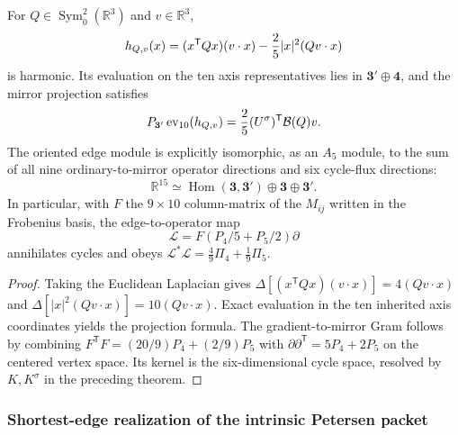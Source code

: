 \documentclass[11pt]{article}
\begin{document}
\begin{proposition}
\label{p1:prop:petersen-cubic-gradient-interface}
\leavevmode\par
For $Q\in\operatorname{Sym}^2_0(\mathbb R^3)$ and $v\in\mathbb R^3$,
\[
 h_{Q,v}(x)=(x^{\mathsf T}Qx)(v\cdot x)
 -{2\over5}|x|^2(Qv\cdot x)
\]
is harmonic. Its evaluation on the ten axis representatives lies in
$\mathbf3'\oplus\mathbf4$, and the mirror projection satisfies
\[
 P_{\mathbf3'}\operatorname{ev}_{10}(h_{Q,v})
 ={2\over5}(U^\sigma)^{\mathsf T}\mathcal B(Q)v.
\]
The oriented edge module is explicitly isomorphic, as an $A_5$
module, to the sum of all nine ordinary-to-mirror operator directions
and six cycle-flux directions:
\[
 \mathbb R^{15}\simeq\operatorname{Hom}(\mathbf3,\mathbf3')
       \oplus\mathbf3\oplus\mathbf3'.
\]
In particular, with $F$ the $9\times10$ column-matrix of the $M_{ij}$
written in the Frobenius basis, the edge-to-operator map
\[
 \mathcal L=F(P_4/5+P_5/2)\partial
\]
annihilates cycles and obeys
$\mathcal L^*\mathcal L=\tfrac49\Pi_4+\tfrac19\Pi_5$.
\end{proposition}
\begin{proof}
Taking the Euclidean Laplacian gives
$\Delta[(x^{\mathsf T}Qx)(v\cdot x)]=4(Qv\cdot x)$ and
$\Delta[|x|^2(Qv\cdot x)]=10(Qv\cdot x)$.
Exact evaluation in the ten inherited axis coordinates yields the
projection formula. The gradient-to-mirror Gram follows by combining
$F^{\mathsf T}F=(20/9)P_4+(2/9)P_5$ with
$\partial\partial^{\mathsf T}=5P_4+2P_5$ on the centered vertex
space. Its kernel is the six-dimensional cycle space, resolved by
$K,K^\sigma$ in the preceding theorem.
\end{proof}


\subsubsection{Shortest-edge realization of the intrinsic Petersen packet}
\label{p1:sec:v371-petersen-600cell-geometry}
\end{document}
